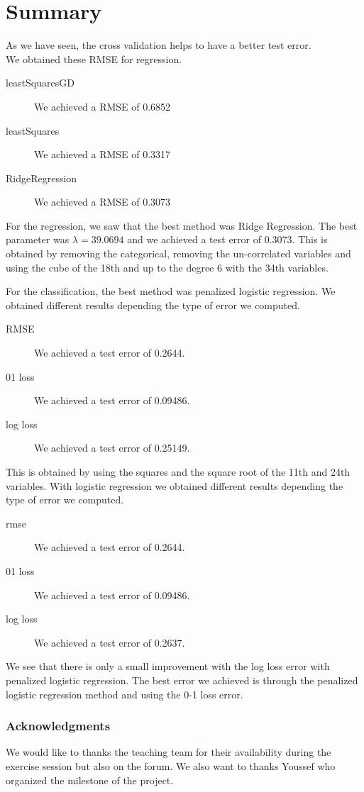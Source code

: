 \documentclass{article} %
\begin{document}
\section{Summary}
As we have seen, the cross validation helps to have a better test error.\\
We obtained these RMSE for regression.
\begin{description}
\item[leastSquaresGD] We achieved a RMSE of 0.6852
\item[leastSquares] We achieved a RMSE of 0.3317
\item[RidgeRegression] We achieved a RMSE of 0.3073
\end{description}
For the regression, we saw that the best method was Ridge Regression. The best parameter was $\lambda =  39.0694$ and we achieved a test error of 0.3073. This is obtained by removing the categorical, removing the un-correlated variables and using the cube of the 18th and up to the degree 6 with the 34th variables.

For the classification, the best method was penalized logistic regression. We obtained different results depending the type of error we computed. \begin{description}
\item[RMSE] We achieved a test error of 0.2644.
\item[01 loss]We achieved a test error of 0.09486.
\item[log loss] We achieved a test error of 0.25149.
\end{description}
This is obtained by using the squares and the square root of the 11th and 24th variables.
With logistic regression we obtained different results depending the type of error we computed. \begin{description}
\item[rmse] We achieved a test error of 0.2644.
\item[01 loss]We achieved a test error of 0.09486.
\item[log loss] We achieved a test error of 0.2637.
\end{description}
We see that there is only a small improvement with the log loss error with penalized logistic regression.
The best error we achieved is through the penalized logistic regression method and using the 0-1 loss error.

\subsubsection*{Acknowledgments}
We would like to thanks the teaching team for their availability during the exercise session but also on the forum. We also want to thanks Youssef who organized the milestone of the project.
\end{document}
